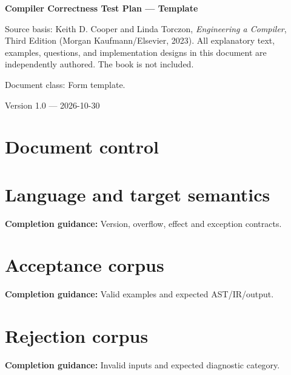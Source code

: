 \documentclass[10pt,letterpaper]{article}
\begin{document}
\hypersetup{pageanchor=false}%
\begin{titlepage}
\centering\vspace*{1.0in}
{\Huge\bfseries\textcolor{CompilerBlue}{Compiler Correctness Test Plan --- Template}\par}
\vspace{.22in}{\Large Authoring form and printable record\par}
\vspace{.4in}{\large Compiler Engineering Documentation Suite\par}
\vfill
\begin{minipage}{.86\linewidth}\small
Source basis: Keith D. Cooper and Linda Torczon, \emph{Engineering a Compiler}, Third Edition (Morgan Kaufmann/Elsevier, 2023). All explanatory text, examples, questions, and implementation designs in this document are independently authored. The book is not included.\par\medskip
Document class: Form template.
\end{minipage}
\vfill\textcolor{CompilerGray}{Version 1.0 --- 2026-10-30}\par
\end{titlepage}\hypersetup{pageanchor=true}
\tableofcontents\clearpage
\section{Document control}
\section{Language and target semantics}
\textbf{Completion guidance:} Version, overflow, effect and exception contracts.\par\medskip{}
\section{Acceptance corpus}
\textbf{Completion guidance:} Valid examples and expected AST/IR/output.\par\medskip{}
\section{Rejection corpus}
\textbf{Completion guidance:} Invalid inputs and expected diagnostic category.\par\medskip{}
\end{document}
